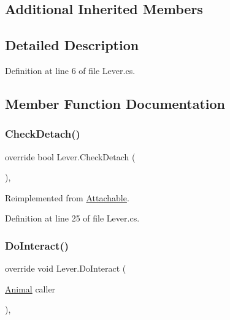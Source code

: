 \subsection*{Additional Inherited Members}


\subsection{Detailed Description}


Definition at line 6 of file Lever.\+cs.



\subsection{Member Function Documentation}
\mbox{\label{class_lever_a564e83f71f387279a5e6ef4c1617e990}} 
\subsubsection{\texorpdfstring{Check\+Detach()}{CheckDetach()}}
{\footnotesize\ttfamily override bool Lever.\+Check\+Detach (\begin{DoxyParamCaption}{ }\end{DoxyParamCaption})\hspace{0.3cm}{\ttfamily [protected]}, {\ttfamily [virtual]}}



Reimplemented from \mbox{\hyperlink{class_attachable_a5cd6ea1bf16c527c033e6f09681f84f8}{Attachable}}.



Definition at line 25 of file Lever.\+cs.

\mbox{\label{class_lever_a0a1c141e11547a71e93492bebbd045d7}} 
\subsubsection{\texorpdfstring{Do\+Interact()}{DoInteract()}}
{\footnotesize\ttfamily override void Lever.\+Do\+Interact (\begin{DoxyParamCaption}\item[{\mbox{\hyperlink{class_animal}{Animal}}}]{caller }\end{DoxyParamCaption})\hspace{0.3cm}{\ttfamily [protected]}, {\ttfamily [virtual]}}



